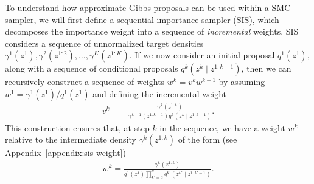 \documentclass{article}
\theoremstyle{definition}
\begin{document}
To understand how approximate Gibbs proposals can be used within a SMC sampler, we will first define a sequential importance sampler (SIS), which decomposes the importance weight into a sequence of \emph{incremental} weights. SIS considers a sequence of unnormalized target densities $\gamma^1(z^1), \gamma^2(z^{1:2}), \dots, \gamma^K(z^{1:K})$. If we now consider an initial proposal $q^1(z^1)$, along with a sequence of conditional proposals $q^k(z^k \mid z^{1:k-1})$, then we can recursively construct a sequence of weights $w^k = v^k w^{k-1}$ by assuming $w^1 = \gamma^1(z^1) / q^1(z^1)$ and defining the incremental weight
\begin{align*}
    v^k 
    &=
    \frac{\gamma^k(z^{1:k})}{\gamma^{k-1}(z^{1:k-1}) q^k(z^k \mid z^{1:k-1})}.
\end{align*}
This construction ensures that, at step $k$ in the sequence, we have a weight $w^k$ relative to the intermediate  density $\gamma^k(z^{1:k})$ of the form (see Appendix~\ref{appendix:sis-weight})
\begin{align*}
    w^k
    = 
    \frac{\gamma^k(z^{1:k})}
         {q^1(z^1) \prod_{k'=2}^k q^{k'}(z^{k'} \mid z^{1:k'-1})}.
\end{align*}


\end{document}
